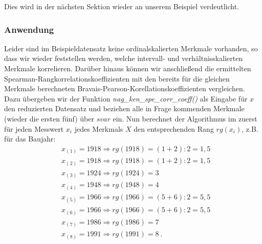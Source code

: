 Dies wird in der nächsten Sektion wieder an unserem Beispiel verdeutlicht.

\subsubsection{Anwendung}

Leider sind im Beispieldatensatz keine ordinalskalierten Merkmale vorhanden, so dass wir wieder feststellen werden, welche intervall- und verhältnisskalierten Merkmale korrelieren. Darüber hinaus können wir anschließend die ermittelten Spearman-Rangkorrelationskoeffizienten mit den bereits für die gleichen Merkmale berechneten Bravais-Pearson-Korellationskoeffizienten vergleichen. Dazu übergeben wir der Funktion {\it nag\_ken\_spe\_corr\_coeff()} als Eingabe für $x$ den reduzierten Datensatz und beziehen alle in Frage kommenden Merkmale (wieder die ersten fünf) über $svar$ ein. Nun berechnet der Algorithmus im zuerst für jeden Messwert $x_i$ jedes Merkmals $X$ den entsprechenden Rang $rg(x_i)$, z.B. für das Baujahr:
\begin{equation*}
	\begin{split}
		& x_{(1)}=1918 \Rightarrow rg(1918)=(1+2):2=1,5\\
		& x_{(2)}=1918 \Rightarrow rg(1918)=(1+2):2=1,5\\
		& x_{(3)}=1924 \Rightarrow rg(1924)=3\\
		& x_{(4)}=1948 \Rightarrow rg(1948)=4\\
		& x_{(5)}=1966 \Rightarrow rg(1966)=(5+6):2=5,5\\
		& x_{(6)}=1966 \Rightarrow rg(1966)=(5+6):2=5,5\\
		& x_{(7)}=1986 \Rightarrow rg(1986)=7\\
		& x_{(8)}=1991 \Rightarrow rg(1991)=8 ~.
	\end{split}
\end{equation*}

